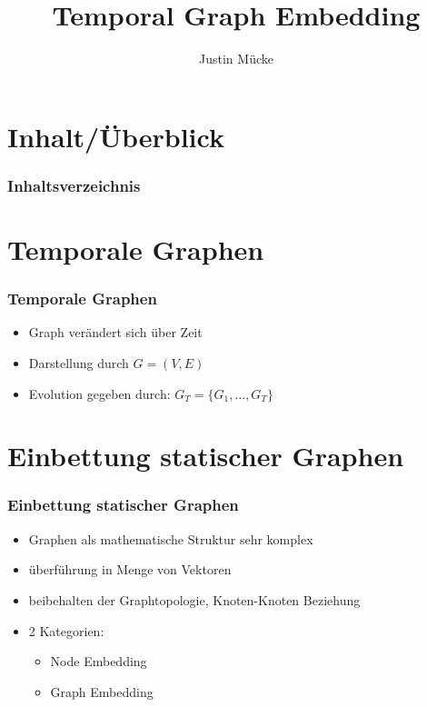 \documentclass{beamer}
\title{Temporal Graph Embedding}
\subtitle{}
\author{Justin Mücke}
\institute
{Universität Ulm, Seminar Data-Science\\}
\begin{document}
\hspace*{-1.49cm}
\frame[plain]{\titlepage}

\hspace*{-0.7cm}
\section*{Inhalt/Überblick} %
\begin{frame}
  \frametitle{Inhaltsverzeichnis}
  \tableofcontents
\end{frame}


\section{Temporale Graphen}
\begin{frame}
  \frametitle{Temporale Graphen}
  \begin{itemize}
    \item Graph verändert sich über Zeit
    \item Darstellung durch \(G=(V,E)\)
    \item Evolution gegeben durch: \(G_T =\{G_1, \ldots, G_T\}\)
  \end{itemize}
\end{frame}

\section{Einbettung statischer Graphen}
\begin{frame}
  \frametitle{Einbettung statischer Graphen}
  \begin{itemize}
    \item Graphen als mathematische Struktur sehr komplex
    \item überführung in Menge von Vektoren
    \item beibehalten der Graphtopologie, Knoten-Knoten Beziehung 
    \item 2 Kategorien:
    \begin{itemize}
      \item Node Embedding
      \item Graph Embedding
    \end{itemize} 
  \end{itemize}
\end{frame}
\end{document}
